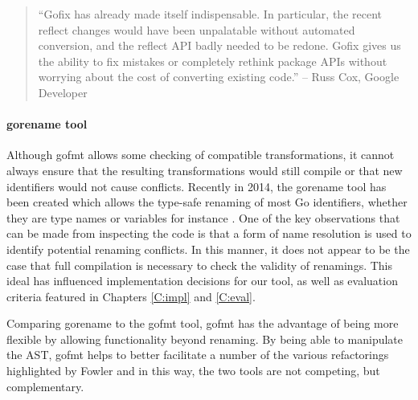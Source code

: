 \begin{quote}
``Gofix has already made itself indispensable. In particular, the recent reflect changes would have been unpalatable without automated conversion, and the reflect API badly needed to be redone. Gofix gives us the ability to fix mistakes or completely rethink package APIs without worrying about the cost of converting existing code.'' -- Russ Cox, Google Developer \cite{gofix11}
\end{quote}

\paragraph{gorename tool}
Although gofmt allows some checking of compatible transformations, it cannot always ensure that the resulting transformations would still compile or that new identifiers would not cause conflicts. Recently in 2014, the gorename tool has been created which allows the type-safe renaming of most Go identifiers, whether they are type names or variables for instance \cite{gorename15}. One of the key observations that can be made from inspecting the code is that a form of name resolution is used to identify potential renaming conflicts. In this manner, it does not appear to be the case that full compilation is necessary to check the validity of renamings. This ideal has influenced implementation decisions for our tool, as well as evaluation criteria featured in Chapters \ref{C:impl} and \ref{C:eval}.

Comparing gorename to the gofmt tool, gofmt has the advantage of being more flexible by allowing functionality beyond renaming. By being able to manipulate the AST, gofmt helps to better facilitate a number of the various refactorings highlighted by Fowler and in this way, the two tools are not competing, but complementary.
